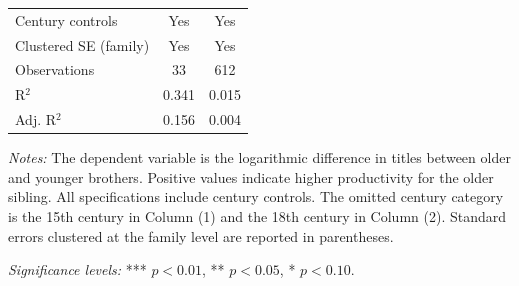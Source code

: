 \begin{table}[H]
\begin{tablebody}
\begin{tabular}{l c c}
\midrule
Century controls & Yes & Yes \\
Clustered SE (family) & Yes & Yes \\
\midrule
Observations & 33 & 612 \\
R$^{2}$ & 0.341 & 0.015 \\
Adj. R$^{2}$ & 0.156 & 0.004 \\
\bottomrule
\end{tabular}
\end{tablebody}

\vspace{4pt}
\begin{minipage}{\textwidth}
\footnotesize
\textit{Notes:} The dependent variable is the logarithmic difference in titles between older and younger brothers. Positive values indicate higher productivity for the older sibling. All specifications include century controls. The omitted century category is the 15th century in Column (1) and the 18th century in Column (2). Standard errors clustered at the family level are reported in parentheses.

\textit{Significance levels:} *** $p<0.01$, ** $p<0.05$, * $p<0.10$.
\end{minipage}

\end{table}